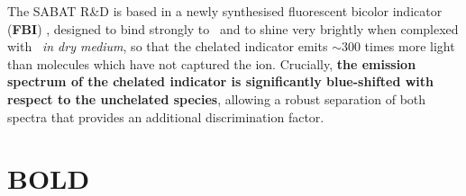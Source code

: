 \documentclass[a4paper,11pt]{article}
\begin{document}
%
The SABAT R\&D is based in a newly synthesised 
fluorescent bicolor indicator (\textbf{FBI}) \cite{Rivilla:2019vzd, Rivilla:2020cvm}, designed to bind strongly to \Bapp\ and to shine very brightly when complexed with \Bapp\ {\it in dry medium}, so that the chelated indicator emits $\sim$300 times more light than molecules which have not captured the ion. Crucially, {\bf the emission spectrum of the chelated indicator is significantly blue-shifted  with respect to the unchelated species}, allowing a robust separation of both spectra that provides an additional discrimination factor. 

\section{BOLD}
\end{document}
